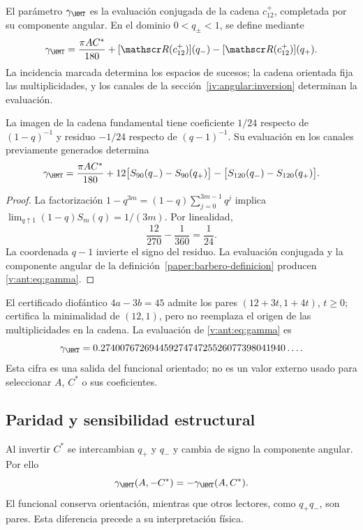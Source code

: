 \begin{definition}
\label{paper:barbero-definicion}
El parámetro \(\gamma_{\HMT}\) es la evaluación conjugada de la cadena
\(c_{12}^{+}\), completada por su componente angular. En el dominio
\(0<q_\pm<1\), se define mediante
\[
\gamma_{\HMT}=\frac{\pi AC^*}{180}
+[\mathscr R(c_{12}^{+})](q_-)-[\mathscr R(c_{12}^{+})](q_+).
\]
La incidencia marcada determina los espacios de sucesos; la cadena
orientada fija las multiplicidades, y los canales de la
sección~\ref{iv:angular:inversion} determinan la evaluación.
\end{definition}

\begin{theorem}
La imagen de la cadena fundamental tiene coeficiente $1/24$
respecto de $(1-q)^{-1}$ y residuo $-1/24$ respecto de $(q-1)^{-1}$.
Su evaluación en los canales previamente generados determina
\begin{equation}
\gamma_{\HMT}=
\frac{\pi AC^*}{180}
+12\bigl[S_{90}(q_-)-S_{90}(q_+)\bigr]
-\bigl[S_{120}(q_-)-S_{120}(q_+)\bigr].
\label{v:ant:eq:gamma}
\end{equation}
\end{theorem}
\begin{proof}
La factorización $1-q^{3m}=(1-q)\sum_{j=0}^{3m-1}q^j$ implica
$\lim_{q\uparrow1}(1-q)S_m(q)=1/(3m)$. Por linealidad,
\[
\frac{12}{270}-\frac1{360}=\frac1{24}.
\]
La coordenada $q-1$ invierte el signo del residuo.
La evaluación conjugada y la componente angular de la definición~\ref{paper:barbero-definicion}
producen \eqref{v:ant:eq:gamma}.
\end{proof}

El certificado diofántico $4a-3b=45$ admite los pares
$(12+3t,1+4t)$, $t\ge0$; certifica la minimalidad de $(12,1)$,
pero no reemplaza el origen de las multiplicidades en la cadena.
La evaluación de \eqref{v:ant:eq:gamma} es
\[
\gamma_{\HMT}
=0.27400767269445927474725526077398041940\ldots.
\]
Esta cifra es una salida del funcional orientado; no es un valor externo
usado para seleccionar $A$, $C^*$ o sus coeficientes.

\subsection{Paridad y sensibilidad estructural}
Al invertir $C^*$ se intercambian $q_+$ y $q_-$ y cambia de signo
la componente angular. Por ello
\[
\gamma_{\HMT}(A,-C^*)=-\gamma_{\HMT}(A,C^*).
\]
El funcional conserva orientación, mientras que otros lectores,
como $q_+q_-$, son pares. Esta diferencia precede a su interpretación física.
